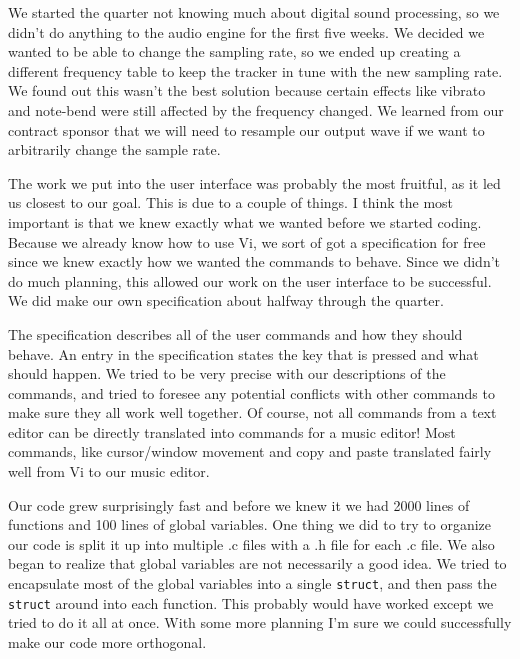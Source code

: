 \documentclass[12pt,letterpaper]{article}
\begin{document}
\par
We started the quarter not knowing much about digital sound processing, so we didn't do anything to the audio engine for the first five weeks. We decided we wanted to be able to change the sampling rate, so we ended up creating a different frequency table to keep the tracker in tune with the new sampling rate. We found out this wasn't the best solution because certain effects like vibrato and note-bend were still affected by the frequency changed. We learned from our contract sponsor that we will need to resample our output wave if we want to arbitrarily change the sample rate.


\par
The work we put into the user interface was probably the most fruitful, as it led us closest to our goal. This is due to a couple of things. I think the most important is that we knew exactly what we wanted before we started coding. Because we already know how to use Vi, we sort of got a specification for free since we knew exactly how we wanted the commands to behave. Since we didn't do much planning, this allowed our work on the user interface to be successful. We did make our own specification about halfway through the quarter.

\par
The specification describes all of the user commands and how they should behave. An entry in the specification states the key that is pressed and what should happen. We tried to be very precise with our descriptions of the commands, and tried to foresee any potential conflicts with other commands to make sure they all work well together. Of course, not all commands from a text editor can be directly translated into commands for a music editor! Most commands, like cursor/window movement and copy and paste translated fairly well from Vi to our music editor.

\par
Our code grew surprisingly fast and before we knew it we had 2000 lines of functions and 100 lines of global variables. One thing we did to try to organize our code is split it up into multiple .c files with a .h file for each .c file. We also began to realize that global variables are not necessarily a good idea. We tried to encapsulate most of the global variables into a single \texttt{struct}, and then pass the \texttt{struct} around into each function. This probably would have worked except we tried to do it all at once. With some more planning I'm sure we could successfully make our code more orthogonal.
\end{document}
